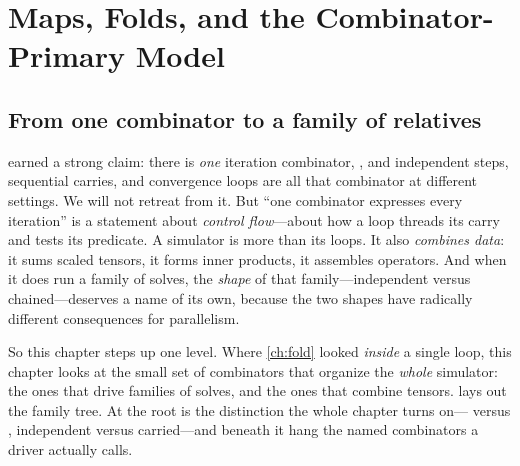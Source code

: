 \chapter{Maps, Folds, and the Combinator-Primary Model}
\label{ch:combinators}


\section{From one combinator to a family of relatives}

 earned a strong claim: there is \emph{one} iteration combinator,
, and independent steps, sequential carries, and convergence
loops are all that combinator at different settings. We will not retreat from it.
But ``one combinator expresses every iteration'' is a statement about
\emph{control flow}---about how a loop threads its carry and tests its predicate. A
simulator is more than its loops. It also \emph{combines data}: it sums scaled
tensors, it forms inner products, it assembles operators. And when it does run a
family of solves, the \emph{shape} of that family---independent versus
chained---deserves a name of its own, because the two shapes have radically
different consequences for parallelism.

So this chapter steps up one level. Where \cref{ch:fold} looked \emph{inside} a
single loop, this chapter looks at the small set of combinators that organize the
\emph{whole} simulator: the ones that drive families of solves, and the ones that
combine tensors.  lays out the family tree. At the root is the
distinction the whole chapter turns on--- versus , independent
versus carried---and beneath it hang the named combinators a driver actually calls.

